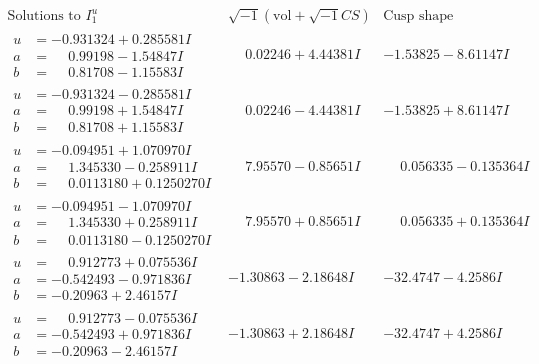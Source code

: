 \documentclass[1p]{elsarticle_modified}
\theoremstyle{definition}
\newcommand{\I}{\sqrt{-1}}
\begin{document}
$$\begin{array}{c|c|c}  
\text{Solutions to }I^u_{1}& \I (\text{vol} + \sqrt{-1}CS) & \text{Cusp shape}\\
 \hline 
\begin{aligned}
u &= -0.931324 + 0.285581 I \\
a &= \phantom{-}0.99198 - 1.54847 I \\
b &= \phantom{-}0.81708 - 1.15583 I\end{aligned}
 & \phantom{-}0.02246 + 4.44381 I & -1.53825 - 8.61147 I \\ \hline\begin{aligned}
u &= -0.931324 - 0.285581 I \\
a &= \phantom{-}0.99198 + 1.54847 I \\
b &= \phantom{-}0.81708 + 1.15583 I\end{aligned}
 & \phantom{-}0.02246 - 4.44381 I & -1.53825 + 8.61147 I \\ \hline\begin{aligned}
u &= -0.094951 + 1.070970 I \\
a &= \phantom{-}1.345330 - 0.258911 I \\
b &= \phantom{-}0.0113180 + 0.1250270 I\end{aligned}
 & \phantom{-}7.95570 - 0.85651 I & \phantom{-}0.056335 - 0.135364 I \\ \hline\begin{aligned}
u &= -0.094951 - 1.070970 I \\
a &= \phantom{-}1.345330 + 0.258911 I \\
b &= \phantom{-}0.0113180 - 0.1250270 I\end{aligned}
 & \phantom{-}7.95570 + 0.85651 I & \phantom{-}0.056335 + 0.135364 I \\ \hline\begin{aligned}
u &= \phantom{-}0.912773 + 0.075536 I \\
a &= -0.542493 - 0.971836 I \\
b &= -0.20963 + 2.46157 I\end{aligned}
 & -1.30863 - 2.18648 I & -32.4747 - 4.2586 I \\ \hline\begin{aligned}
u &= \phantom{-}0.912773 - 0.075536 I \\
a &= -0.542493 + 0.971836 I \\
b &= -0.20963 - 2.46157 I\end{aligned}
 & -1.30863 + 2.18648 I & -32.4747 + 4.2586 I \\ \hline\begin{aligned}

\end{aligned}
\end{array}$$
\end{document}
